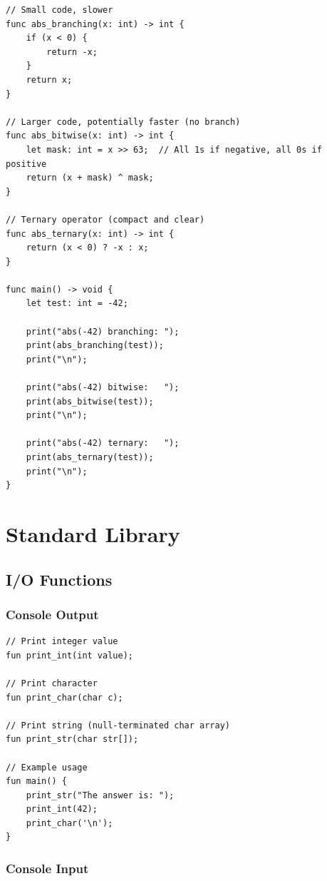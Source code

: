 \documentclass[12pt,a4paper,oneside]{book}
\begin{document}
\begin{lstlisting}[style=algo, caption={Optimization Strategy}]
// Small code, slower
func abs_branching(x: int) -> int {
    if (x < 0) {
        return -x;
    }
    return x;
}

// Larger code, potentially faster (no branch)
func abs_bitwise(x: int) -> int {
    let mask: int = x >> 63;  // All 1s if negative, all 0s if positive
    return (x + mask) ^ mask;
}

// Ternary operator (compact and clear)
func abs_ternary(x: int) -> int {
    return (x < 0) ? -x : x;
}

func main() -> void {
    let test: int = -42;
    
    print("abs(-42) branching: ");
    print(abs_branching(test));
    print("\n");
    
    print("abs(-42) bitwise:   ");
    print(abs_bitwise(test));
    print("\n");
    
    print("abs(-42) ternary:   ");
    print(abs_ternary(test));
    print("\n");
}
\end{lstlisting}

\chapter{Standard Library}

\section{I/O Functions}

\subsection{Console Output}

\begin{lstlisting}[style=algo, caption={Standard Output Functions}]
// Print integer value
fun print_int(int value);

// Print character
fun print_char(char c);

// Print string (null-terminated char array)
fun print_str(char str[]);

// Example usage
fun main() {
    print_str("The answer is: ");
    print_int(42);
    print_char('\n');
}
\end{lstlisting}

\subsection{Console Input}
\end{document}
